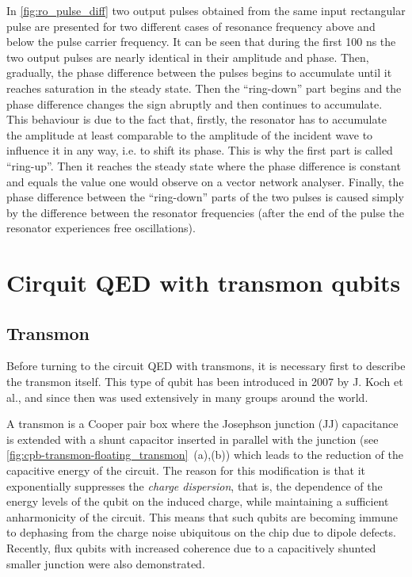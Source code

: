 \documentclass[12pt, twoside]{report}
\numberwithin{equation}{section}
\begin{document}
In \autoref{fig:ro_pulse_diff} two output pulses obtained from the same input rectangular pulse are presented for two different cases of resonance frequency above and below the pulse carrier frequency. It can be seen that during the first 100 ns the two output pulses are nearly identical in their amplitude and phase. Then, gradually, the phase difference between the pulses begins to accumulate until it reaches saturation in the steady state. Then the ``ring-down'' part begins and the phase difference changes the sign abruptly and then continues to accumulate. This behaviour is due to the fact that, firstly, the resonator has to accumulate the amplitude at least comparable to the amplitude of the incident wave to influence it in any way, i.e. to shift its phase. This is why the first part is called ``ring-up''. Then it reaches the steady state where the phase difference is constant and equals the value one would observe on a vector network analyser. Finally, the phase difference between the ``ring-down'' parts of the two pulses is caused simply by the difference between the resonator frequencies (after the end of the pulse the resonator experiences free oscillations).



\newpage

\section{Cirquit QED with transmon qubits}\label{sec:cQED}

\subsection{Transmon}

Before turning to the circuit QED with transmons, it is necessary first to describe the transmon itself. This type of qubit has been introduced\cite{Koch2007} in 2007 by J. Koch et al., and since then was used extensively in many groups around the world. 

A transmon is a Cooper pair box where the Josephson junction (JJ) capacitance is extended with a shunt capacitor inserted in parallel with the junction (see \autoref{fig:cpb-transmon-floating_transmon}~(a),(b)) which leads to the reduction of the capacitive energy of the circuit. The reason for this modification is that it exponentially suppresses the \textit{charge dispersion}, that is, the dependence of the energy levels of the qubit on the induced charge, while maintaining a sufficient anharmonicity of the circuit. This means that such qubits are becoming immune to dephasing from the charge noise ubiquitous on the chip due to dipole defects. Recently, flux qubits with increased coherence due to a capacitively shunted smaller junction were also demonstrated\cite{yan2015}.
\end{document}
